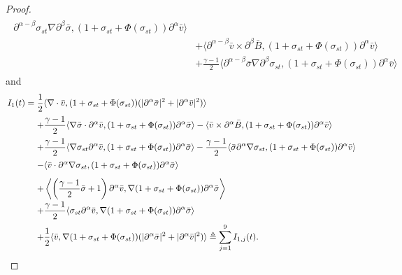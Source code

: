 \documentclass[11pt]{amsart}
\numberwithin{equation}{section}
\begin{document}
\begin{proof}
\begin{eqnarray*}
\begin{array}{rl}
\partial^{\alpha-\beta}\sigma_{st} \nabla \partial^{\beta}\bar{\sigma}
,(1+\sigma_{st}+\Phi(\sigma_{st}))\partial^{\alpha}\bar{v}\rangle\\[3mm]
&\displaystyle+\langle
\partial^{\alpha-\beta}\bar{v}\times  \partial^{\beta}\bar{B}
,(1+\sigma_{st}+\Phi(\sigma_{st}))\partial^{\alpha}\bar{v}\rangle\\[3mm]
&\displaystyle+\frac{\gamma-1}{2}\langle
\partial^{\alpha-\beta}\bar{\sigma} \nabla \partial^{\beta}\sigma_{st} ,(1+\sigma_{st}+\Phi(\sigma_{st}))
\partial^{\alpha}\bar{v} \rangle
\end{array}
\end{eqnarray*}
and
\begin{eqnarray*}
\arraycolsep=1.5pt
\begin{array}{rl}
 I_{1}(t)=&
 \displaystyle\frac{1}{2}\langle \nabla \cdot \bar{v},
 (1+\sigma_{st}+\Phi(\sigma_{st}))(|\partial^{\alpha}\bar{\sigma}|^{2}+|\partial^{\alpha}\bar{v}|^{2})
 \rangle\\[3mm]
 & \displaystyle+ \frac{\gamma-1}{2}\langle \nabla
\bar{\sigma}\cdot\partial^{\alpha}\bar{v}
,(1+\sigma_{st}+\Phi(\sigma_{st}))\partial^{\alpha}\bar{\sigma}
\rangle-\langle \bar{v}\times
\partial^{\alpha}\bar{B},(1+\sigma_{st}+\Phi(\sigma_{st}))\partial^{\alpha}\bar{v}\rangle\\[3mm]
& \displaystyle+\frac{\gamma-1}{2}\langle \nabla\sigma_{st}
\partial^{\alpha}\bar{v},(1+\sigma_{st}+\Phi(\sigma_{st}))\partial^{\alpha}\bar{\sigma}
\rangle-\frac{\gamma-1}{2}\langle \bar{\sigma}\partial^{\alpha}
\nabla\sigma_{st},(1+\sigma_{st}+\Phi(\sigma_{st}))\partial^{\alpha}\bar{v}
\rangle\\[3mm]
&- \displaystyle \langle \bar{v}\cdot\partial^{\alpha}
\nabla\sigma_{st},(1+\sigma_{st}+\Phi(\sigma_{st}))\partial^{\alpha}\bar{\sigma}
\rangle\\[3mm]
&\displaystyle+\left\langle
\left(\frac{\gamma-1}{2}\bar{\sigma}+1\right)\partial^{\alpha}\bar{v},
\nabla(1+\sigma_{st}+\Phi(\sigma_{st}))\partial^{\alpha}\bar{\sigma}
\right\rangle\\[3mm]
& \displaystyle +\frac{\gamma-1}{2}\langle \sigma_{st}
\partial^{\alpha}\bar{v},\nabla(1+\sigma_{st}+\Phi(\sigma_{st}))\partial^{\alpha}\bar{\sigma}
\rangle\\[3mm]
&\displaystyle+\frac{1}{2}\langle\bar{v},\nabla(1+\sigma_{st}+\Phi(\sigma_{st}))
(|\partial^{\alpha}\bar{\sigma}|^2+|\partial^{\alpha}\bar{v}|^{2})\rangle\triangleq\sum_{j=1}^{9}I_{1,j}(t).
\end{array}
\end{eqnarray*}

\end{proof}
\end{document}
